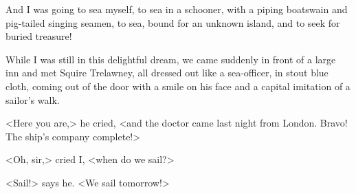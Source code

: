And I was going to sea myself, to sea in a schooner, with a piping boatswain and pig-tailed singing seamen, to sea, bound for an unknown island, and to seek for buried treasure!

While I was still in this delightful dream, we came suddenly in front of a large inn and met Squire Trelawney, all dressed out like a sea-officer, in stout blue cloth, coming out of the door with a smile on his face and a capital imitation of a sailor's walk.

<Here you are,> he cried, <and the doctor came last night from London. Bravo! The ship's company complete!>

<Oh, sir,> cried I, <when do we sail?>

<Sail!> says he. <We sail tomorrow!>
